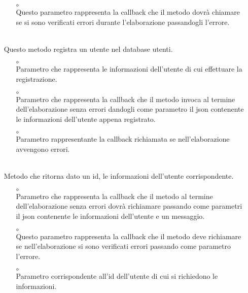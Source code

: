 \begin{itemize}
\begin{itemize}
\item[$\circ$]  \\ Questo parametro rappresenta la callback che il metodo dovrà chiamare se si sono verificati errori durante l'elaborazione passandogli l'errore.
\end{itemize}
\item[]  \\ Questo metodo registra un utente nel database utenti.
\begin{itemize}\addtolength{\itemsep}{-0.5\baselineskip}
\item[$\circ$]  \\ Parametro che rappresenta le informazioni dell'utente di cui effettuare la registrazione.
\item[$\circ$]  \\ Parametro che rappresenta la callback che il metodo invoca al termine dell'elaborazione senza errori dandogli come parametro il json contenente le informazioni dell'utente appena registrato.
\item[$\circ$]  \\ Parametro rappresentante la callback richiamata se nell'elaborazione avvengono errori.
\end{itemize}
\item[]  \\ Metodo che ritorna dato un id, le informazioni dell'utente corrispondente.
\begin{itemize}\addtolength{\itemsep}{-0.5\baselineskip}
\item[$\circ$]  \\ Parametro che rappresenta la callback che il metodo al termine dell'elaborazione senza errori dovrà richiamare passando come parametri il json contenente le informazioni dell'utente e un messaggio.
\item[$\circ$]  \\ Questo parametro rappresenta la callback che il metodo deve richiamare se nell'elaborazione si sono verificati errori passando come parametro l'errore.
\item[$\circ$]  \\ Parametro corrispondente all'id dell'utente di cui si richiedono le informazioni. 

\end{itemize}
\end{itemize}
